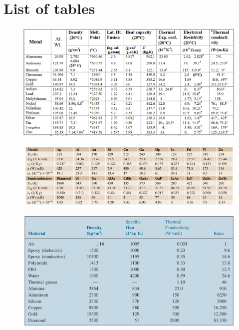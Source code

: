 \documentclass[final]{cubedoc}
\begin{document}
	
	\section{List of tables}\label{list_tables}
	
	
	
	\begin{figure}[h!]
		\centering
		\includegraphics[width=\linewidth]{docs/mist_heat_capacity.png}
		\caption{\cite[p.37]{solder}}
		\label{fig:metal_table_1}
	\end{figure}
	
	\begin{figure}[h!]
		\centering
		\includegraphics[width=\linewidth]{docs/table_properties_springer.png}
		\caption{\cite[p.428]{kasap2017springer}}
		\label{fig:metal_table_2}
	\end{figure}
	
	\begin{figure}[h!]
		\centering
		\includegraphics[width=\linewidth]{docs/table_properties_bible.png}
		\caption{\cite[p.222]{tummala2001fundamentals}}
		\label{fig:fr4properties}
	\end{figure}
	
\end{document}
